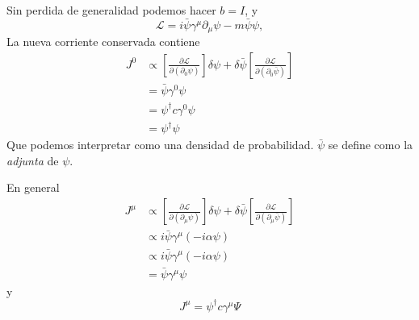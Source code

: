 Sin perdida de generalidad podemos hacer $b=I$, y
\begin{equation}
  \label{eq:100}
    \mathcal{L}=i\bar{\psi} \gamma^\mu\partial_\mu\psi-m\bar{\psi} \psi,
\end{equation}
La nueva corriente conservada contiene
\begin{align}
  J^0&\propto\left[\frac{\partial\mathcal{L}}{\partial\left(\partial_0\psi\right)}\right]\delta\psi+\delta\bar{\psi}\left[\frac{\partial\mathcal{L}}{\partial\left(\partial_0\bar{\psi}\right)}\right]\nonumber\\
  &=\bar{\psi}\gamma^0\psi\nonumber\\
  &=\psi^\dagger c \gamma^0 \psi\nonumber\\
  &=\psi^\dagger\psi
\end{align}
Que podemos interpretar como una densidad de probabilidad. $\bar \psi$ se define como la \emph{adjunta} de $\psi$.

En general
\begin{align}
   J^\mu&\propto\left[\frac{\partial\mathcal{L}}{\partial\left(\partial_\mu\psi\right)}\right]\delta\psi+\delta\bar{\psi}\left[\frac{\partial\mathcal{L}}{\partial\left(\partial_\mu\bar{\psi}\right)}\right]\nonumber\\
   &\propto i\bar{\psi}\gamma^\mu(-i\alpha\psi)\nonumber\\
   &\propto i\bar{\psi}\gamma^\mu(-i\alpha\psi)\nonumber\\
   &=\bar{\psi}\gamma^\mu\psi
\end{align}
y
\begin{equation}
     J^\mu=\psi^\dagger c \gamma^\mu\Psi
\end{equation}

